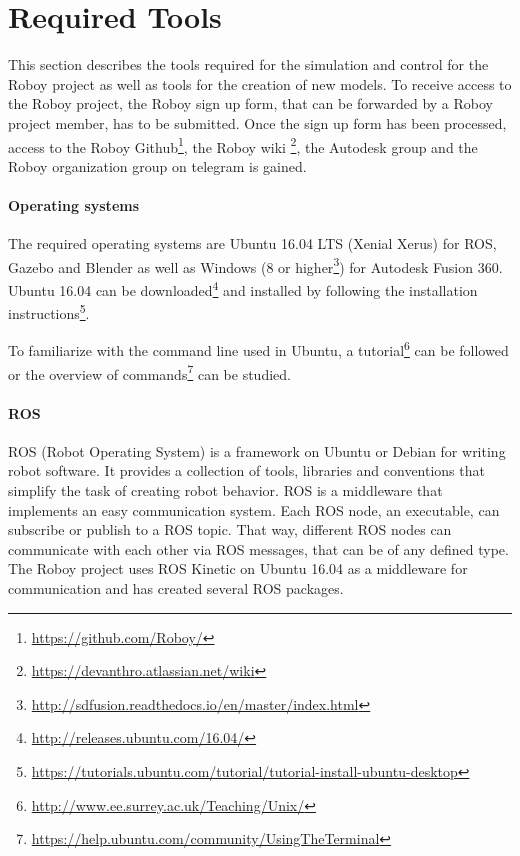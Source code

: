 
\chapter{Required Tools}\label{chapter:Tools}

This section describes the tools required for the simulation and control for the Roboy project as well as tools for the creation of new models. To receive access to the Roboy project, the Roboy sign up form, that can be forwarded by a Roboy project member, has to be submitted. Once the sign up form has been processed, access to the Roboy Github\footnote{\url{https://github.com/Roboy/}}, the Roboy wiki \footnote{\url{https://devanthro.atlassian.net/wiki}}, the Autodesk group and the Roboy organization group on telegram is gained.

\subsubsection*{Operating systems}
The required operating systems are Ubuntu 16.04 LTS (Xenial Xerus) for ROS, Gazebo and Blender\cite{ROS,Gazebo,Blender} as well as Windows (8 or higher\footnote{\url{http://sdfusion.readthedocs.io/en/master/index.html}}) for Autodesk Fusion 360\cite{Autodesk}. Ubuntu 16.04 can be downloaded\footnote{\url{http://releases.ubuntu.com/16.04/}} and installed by following the installation instructions\footnote{\url{https://tutorials.ubuntu.com/tutorial/tutorial-install-ubuntu-desktop}}.

To familiarize with the command line used in Ubuntu, a tutorial\footnote{\url{http://www.ee.surrey.ac.uk/Teaching/Unix/}} can be followed or the overview of commands\footnote{\url{https://help.ubuntu.com/community/UsingTheTerminal}} can be studied. 

\subsubsection*{ROS}
ROS (Robot Operating System) is a framework on Ubuntu or Debian for writing robot software. It provides a collection of tools, libraries and conventions that simplify the task of creating robot behavior\cite{ROS}. ROS is a middleware that implements an easy communication system. Each ROS node, an executable, can subscribe or publish to a ROS topic. That way, different ROS nodes can communicate with each other via ROS messages, that can be of any defined type. The Roboy project uses ROS Kinetic on Ubuntu 16.04 as a middleware for communication and has created several ROS packages.


